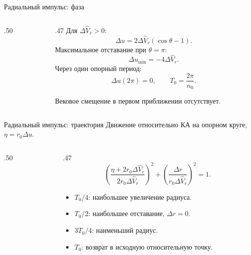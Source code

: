 \documentclass[11pt,aspectratio=169,t]{beamer}
\newcommand{\eqcompact}{\fontsize{10}{12}\selectfont}
\begin{document}
\begin{frame}{Радиальный импульс: фаза}
\relax
\begin{columns}[T,onlytextwidth]
\begin{column}{.50\textwidth}
\centering
\end{column}
\begin{column}{.47\textwidth}
Для $\Delta\widehat V_r>0$:
{\eqcompact
\setlength{\abovedisplayskip}{3pt}\setlength{\belowdisplayskip}{3pt}
\setlength{\abovedisplayshortskip}{2pt}\setlength{\belowdisplayshortskip}{2pt}
\[
 \Delta u=2{\Delta\widehat V_r}(\cos\theta-1).
\]
}
Максимальное отставание при $\theta=\pi$:
{\eqcompact
\setlength{\abovedisplayskip}{3pt}\setlength{\belowdisplayskip}{3pt}
\setlength{\abovedisplayshortskip}{2pt}\setlength{\belowdisplayshortskip}{2pt}
\[
 \Delta u_{\min}=-4\Delta\widehat V_r.
\]
}
Через один опорный период:
{\eqcompact
\setlength{\abovedisplayskip}{3pt}\setlength{\belowdisplayskip}{3pt}
\setlength{\abovedisplayshortskip}{2pt}\setlength{\belowdisplayshortskip}{2pt}
\[
 \Delta u(2\pi)=0,\qquad T_0=\frac{2\pi}{n_0}.
\]
}
{\justifying
Вековое смещение в первом приближении отсутствует.\par}
\end{column}
\end{columns}
\end{frame}

\begin{frame}{Радиальный импульс: траектория}
\relax
Движение относительно КА на опорном круге, $\eta=r_0\Delta u$.
\smallskip
\begin{columns}[T,onlytextwidth]
\begin{column}{.50\textwidth}
\centering
\end{column}
\begin{column}{.47\textwidth}
{\eqcompact
\setlength{\abovedisplayskip}{3pt}\setlength{\belowdisplayskip}{3pt}
\setlength{\abovedisplayshortskip}{2pt}\setlength{\belowdisplayshortskip}{2pt}
\[
 \left(\frac{\eta+2r_0{\Delta\widehat V_r}}{2r_0{\Delta\widehat V_r}}\right)^2
 +\left(\frac{\Delta r}{r_0{\Delta\widehat V_r}}\right)^2=1.
\]
}
\begin{itemize}
 \setlength{\itemsep}{2pt}
 \item $T_0/4$: наибольшее увеличение радиуса.
 \item $T_0/2$: наибольшее отставание, $\Delta r=0$.
 \item $3T_0/4$: наименьший радиус.
 \item $T_0$: возврат в исходную относительную точку.
\end{itemize}
\end{column}
\end{columns}
\end{frame}
\end{document}
